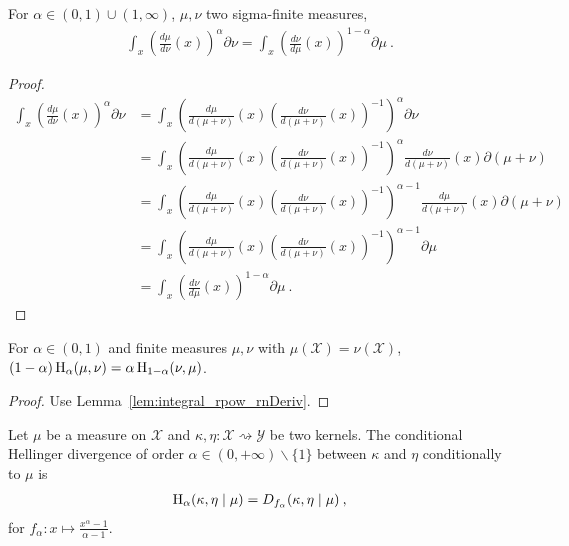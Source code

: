 \begin{lemma}
  \label{lem:integral_rpow_rnDeriv}
  \leanok
  \uses{}
  For $\alpha \in (0,1)\cup(1, \infty)$, $\mu, \nu$ two sigma-finite measures,
  \begin{align*}
  \int_x \left(\frac{d \mu}{d \nu}(x)\right)^\alpha \partial \nu
  = \int_x \left(\frac{d \nu}{d \mu}(x)\right)^{1 - \alpha} \partial \mu
  \: .
  \end{align*}
\end{lemma}

\begin{proof}\leanok
\uses{}
\begin{align*}
  \int_x \left(\frac{d \mu}{d \nu}(x)\right)^\alpha \partial \nu
  &= \int_x \left(\frac{d \mu}{d (\mu + \nu)}(x) \left(\frac{d \nu}{d (\mu + \nu)}(x)\right)^{-1} \right)^\alpha \partial \nu \\
  &= \int_x \left(\frac{d \mu}{d (\mu + \nu)}(x) \left(\frac{d \nu}{d (\mu + \nu)}(x)\right)^{-1} \right)^\alpha \frac{d \nu}{d (\mu + \nu)}(x) \partial (\mu + \nu) \\
  &= \int_x \left(\frac{d \mu}{d (\mu + \nu)}(x) \left(\frac{d \nu}{d (\mu + \nu)}(x)\right)^{-1} \right)^{\alpha - 1} \frac{d \mu}{d (\mu + \nu)}(x) \partial (\mu + \nu) \\
  &= \int_x \left(\frac{d \mu}{d (\mu + \nu)}(x) \left(\frac{d \nu}{d (\mu + \nu)}(x)\right)^{-1} \right)^{\alpha - 1} \partial \mu \\
  &= \int_x \left(\frac{d \nu}{d \mu}(x)\right)^{1 - \alpha} \partial \mu
  \: .
  \end{align*}
\end{proof}

\begin{lemma}
  \label{lem:hellingerAlpha_symm}
  \leanok
  For $\alpha \in (0, 1)$ and finite measures $\mu, \nu$ with $\mu(\mathcal X) = \nu(\mathcal X)$, $(1 - \alpha) \operatorname{H}_\alpha(\mu, \nu) = \alpha \operatorname{H}_{1 - \alpha}(\nu, \mu)$.
\end{lemma}

\begin{proof}\leanok
{}
Use Lemma~\ref{lem:integral_rpow_rnDeriv}.
\end{proof}


\begin{definition}
  \label{def:condHellingerAlpha}
  \leanok
  Let $\mu$ be a measure on $\mathcal X$ and $\kappa, \eta : \mathcal X \rightsquigarrow \mathcal Y$ be two kernels. The conditional Hellinger divergence of order $\alpha \in (0,+\infty) \backslash \{1\}$ between $\kappa$ and $\eta$ conditionally to $\mu$ is
  \begin{align*}
  \operatorname{H}_\alpha(\kappa, \eta \mid \mu) = D_{f_\alpha}(\kappa, \eta \mid \mu) \: ,
  \end{align*}
  for $f_\alpha : x \mapsto \frac{x^{\alpha} - 1}{\alpha - 1}$.
\end{definition}


